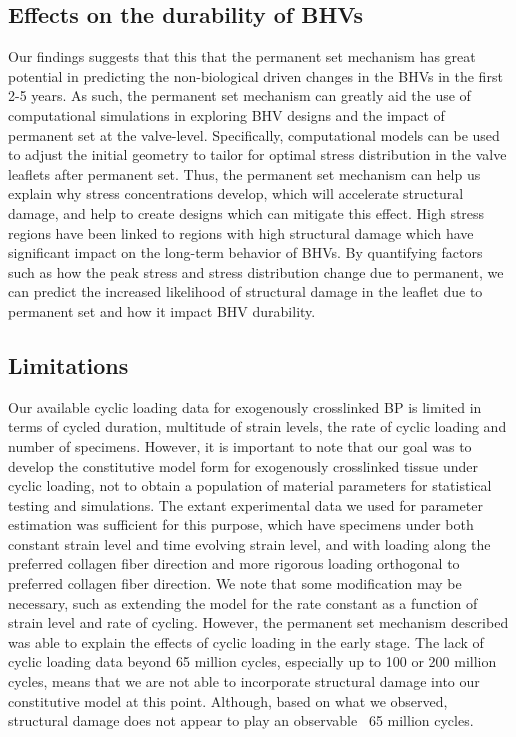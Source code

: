 \subsection{Effects on the durability of BHVs}
    Our findings suggests that this that the permanent set mechanism has great potential in predicting the non-biological driven changes in the BHVs in the first 2-5 years. As such, the permanent set mechanism can greatly aid the use of computational simulations in exploring BHV designs and the impact of permanent set at the valve-level. Specifically, computational models can be used to adjust the initial geometry to tailor for optimal stress distribution in the valve leaflets after permanent set. Thus, the permanent set mechanism can help us explain why stress concentrations develop, which will accelerate structural damage, and help to create designs which can mitigate this effect. High stress regions have been linked to regions with high structural damage which have significant impact on the long-term behavior of BHVs. By quantifying factors such as how the peak stress and stress distribution change due to permanent, we can predict the increased likelihood of structural damage in the leaflet due to permanent set and how it impact BHV durability.
    

\subsection{Limitations} 
	Our available cyclic loading data for exogenously crosslinked BP is limited in terms of cycled duration, multitude of strain levels, the rate of cyclic loading and number of specimens. 
	However, it is important to note that our goal was to develop the constitutive model form for exogenously crosslinked tissue under cyclic loading, not to obtain a population of material parameters for statistical testing and simulations. 
	The extant experimental data we used for parameter estimation was sufficient for this purpose, which have specimens under both constant strain level and time evolving strain level, and with loading along the preferred collagen fiber direction and more rigorous loading orthogonal to preferred collagen fiber direction.
	We note that some modification may be necessary, such as extending the model for the rate constant as a function of strain level and rate of cycling. 
	However, the permanent set mechanism described was able to explain the effects of cyclic loading in the early stage. 
	The lack of cyclic loading data beyond 65 million cycles, especially up to 100 or 200 million cycles, means that we are not able to incorporate structural damage into our constitutive model at this point. 
	Although, based on what we observed, structural damage does not appear to play an observable ~65 million cycles. 